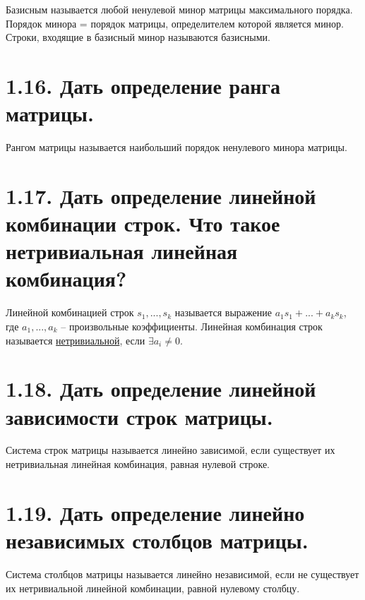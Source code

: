 \documentclass{article}
\begin{document}
Базисным называется любой ненулевой минор матрицы максимального порядка. Порядок минора = порядок матрицы, определителем которой является минор.
\newline Строки, входящие в базисный минор называются базисными.

\section*{\LARGE 1.16. Дать определение ранга матрицы.  }

Рангом матрицы называется наибольший порядок ненулевого минора матрицы.

\section*{\LARGE 1.17. Дать определение линейной комбинации строк. Что такое нетривиальная линейная комбинация?  }

Линейной комбинацией строк $s_1, ..., s_k$ называется выражение $a_1s_1 + ... + a_ks_k$, где $a_1, ... , a_k$ -- произвольные коэффициенты.
\newline Линейная комбинация строк называется \underline{нетривиальной}, если $\exists a_i \ne 0$.

\section*{\LARGE 1.18. Дать определение линейной зависимости строк матрицы.  }

Система строк матрицы называется линейно зависимой, если существует их нетривиальная линейная комбинация, равная нулевой строке.

\section*{\LARGE 1.19. Дать определение линейно независимых столбцов матрицы.  }

Система столбцов матрицы называется линейно независимой, если не существует их нетривиальной линейной комбинации, равной нулевому столбцу.
\end{document}
